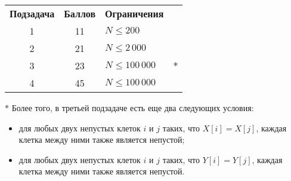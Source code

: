 \begin{tabular}{cclc}
\bf{Подзадача}&\bf{Баллов}&\bf{Ограничения}\\
1&11&$N \le 200$\\
2&21&$N \le 2\,000$\\
3&23&$N \le 100\,000$&\LARGE{$*$}\\
4&45&$N \le 100\,000$\\
\end{tabular}

\LARGE{$*$} Более того, в третьей подзадаче есть еще два следующих условия: 
\begin{itemize}
\item для любых двух непустых клеток $i$ и $j$ таких, что $X[i] = X[j]$, каждая клетка между ними также является непустой;
\item для любых двух непустых клеток $i$ и $j$ таких, что $Y[i] = Y[j]$, каждая клетка между ними также является непустой.
\end{itemize} 
